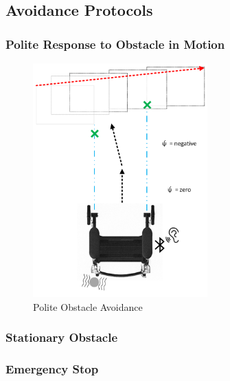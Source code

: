 \subsection{Avoidance Protocols}




\subsubsection{Polite Response to Obstacle in Motion}
\begin{figure}[H]
	\centering
	\includegraphics[width=0.6\textwidth]{./Images/Polite-Mobile-Obstacle-Avoidance.png}
	\caption{\label{fig:polite}Polite Obstacle Avoidance}
\end{figure}


\subsubsection{Stationary Obstacle}

\subsubsection{Emergency Stop}